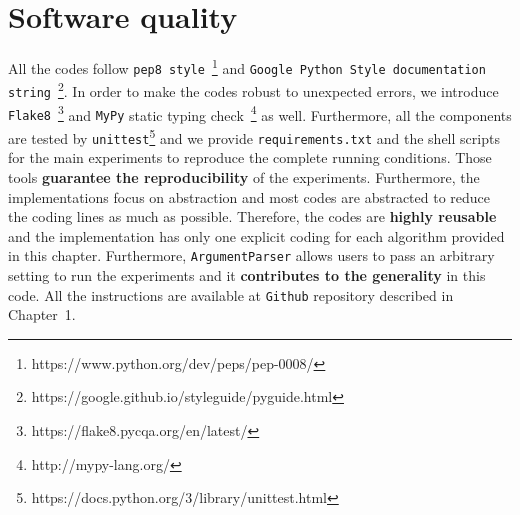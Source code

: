 \section{Software quality}
All the codes follow {\tt pep8 style}~\footnote{https://www.python.org/dev/peps/pep-0008/}
and {\tt Google Python Style documentation string}~\footnote{https://google.github.io/styleguide/pyguide.html}.
In order to make the codes robust to unexpected errors,
we introduce
{\tt Flake8}~\footnote{https://flake8.pycqa.org/en/latest/}
and {\tt MyPy} static typing check~\footnote{http://mypy-lang.org/} as well.
Furthermore, all the components are tested by
{\tt unittest}\footnote{https://docs.python.org/3/library/unittest.html}
and we provide {\tt requirements.txt}
and the shell scripts for the main experiments
to reproduce the complete running conditions.
Those tools {\bf guarantee the reproducibility} of the experiments.
Furthermore, the implementations focus on abstraction and
most codes are abstracted to reduce the coding lines as much as possible.
Therefore, the codes are {\bf highly reusable} and
the implementation has only one explicit coding for
each algorithm provided in this chapter.
Furthermore, {\tt ArgumentParser} allows users to
pass an arbitrary setting to run the experiments
and it {\bf contributes to the generality} in this code.
All the instructions are available at {\tt Github} repository
described in Chapter~1.
